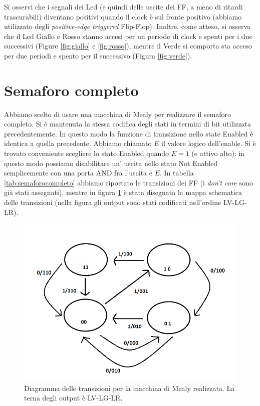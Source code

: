 \documentclass[10pt,a4paper]{article}
\begin{document}
Si osservi che i segnali dei Led (e quindi delle uscite dei FF, a meno di ritardi trascurabili) diventano positivi quando il clock è sul fronte positivo (abbiamo utilizzato degli \emph{positive-edge triggered} Flip-Flop). Inoltre, come atteso, si osserva che il Led Giallo e Rosso stanno accesi per un periodo di clock e spenti per i due successivi (Figure \ref{fig:giallo} e \ref{fig:rosso}), mentre il Verde si comporta sta acceso per due periodi e spento per il successivo (Figura \ref{fig:verde}).

\section{Semaforo completo}
Abbiamo scelto di usare una macchina di Mealy per realizzare il semaforo completo. Si è mantenuta la stessa codifica degli stati in termini di bit utilizzata precedentemente. In questo modo la funzione di transizione nello state Enabled è identica a quella precedente. Abbiamo chiamato $E$ il valore logico dell'enable.
Si è trovato conveniente scegliere lo stato Enabled quando $E = 1$ (e attivo alto): in questo modo possiamo disabilitare un' uscita nello stato Not Enabled semplicemente con una porta AND fra l'uscita e $E$. In tabella \ref{tab:semaforocompleto} abbiamo riportato le transizioni dei FF (i \emph{don't care} sono già stati assegnati), mentre in figura \ref{fig:FSMcomplete} è stata disegnata la mappa schematica delle transizioni (nella figura gli output sono stati codificati nell'ordine LV-LG-LR).

\begin{figure}[!htb]
\centering
\includegraphics[scale=0.7]{FSMcomplete.png}
\caption{Diagramma delle transizioni per la macchina di Mealy realizzata. La terna degli output è LV-LG-LR.\label{fig:FSMcomplete}}
\end{figure}
\end{document}
